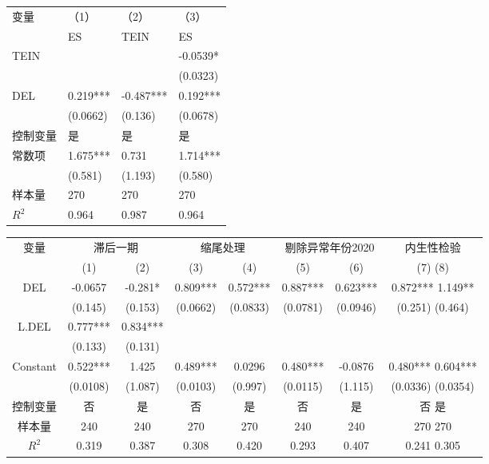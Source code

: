 \begin{center}
    \begin{tabular}{llll}
    \hline
    变量 & （1） & （2） & （3） \\
    ~ & ES & TEIN & ES \\
    \hline
    TEIN & ~ & ~ & -0.0539* \\
    ~ & ~ & ~ & (0.0323) \\
    DEL & 0.219*** & -0.487*** & 0.192*** \\
    ~ & (0.0662) & (0.136) & (0.0678) \\
    控制变量 & 是 & 是 & 是 \\
    常数项 & 1.675*** & 0.731 & 1.714*** \\
    ~ & (0.581) & (1.193) & (0.580) \\
    样本量 & 270 & 270 & 270 \\
    $R^{2}$ & 0.964 & 0.987 & 0.964 \\
    \hline
    \end{tabular}
\end{center}

\begin{center}
    \small
    \setlength{\tabcolsep}{6pt}
    \begin{tabular}{cccccccc}
    \hline
  变量 & \multicolumn{2}{c}{滞后一期} & \multicolumn{2}{c}{缩尾处理} & \multicolumn{2}{c}{剔除异常年份2020} & \multicolumn{1}{c}{内生性检验} \\
      & (1) & (2) & (3) & (4) & (5) & (6) & (7) (8) \\
    \hline
  DEL          & -0.0657  & -0.281*  & 0.809*** & 0.572*** & 0.887*** & 0.623*** & 0.872*** 1.149** \\
             & (0.145)  & (0.153)  & (0.0662) & (0.0833) & (0.0781) & (0.0946) & (0.251) (0.464) \\
  L.DEL        & 0.777*** & 0.834*** & ~        & ~        & ~        & ~        & ~ ~ \\
             & (0.133)  & (0.131)  & ~        & ~        & ~        & ~        & ~ ~ \\
  Constant     & 0.522*** & 1.425    & 0.489*** & 0.0296   & 0.480*** & -0.0876  & 0.480*** 0.604*** \\
             & (0.0108) & (1.087)  & (0.0103) & (0.997)  & (0.0115) & (1.115)  & (0.0336) (0.0354) \\
  控制变量     & 否       & 是       & 否       & 是       & 否       & 是       & 否 是 \\
  样本量       & 240      & 240      & 270      & 270      & 240      & 240      & 270 270 \\
  $R^2$        & 0.319    & 0.387    & 0.308    & 0.420    & 0.293    & 0.407    & 0.241 0.305 \\
    \hline
  \end{tabular}
\end{center}

